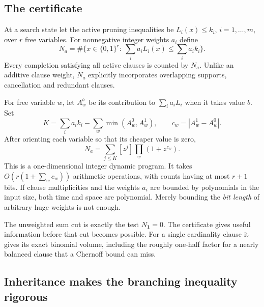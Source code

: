 \documentclass[11pt,a4paper]{article}
\theoremstyle{remark}
\begin{document}
\subsection{The certificate}

At a search state let the active pruning inequalities be
$L_i(x)\le k_i$, $i=1,\ldots,m$, over $r$ free variables. For nonnegative
integer weights $a_i$ define
\begin{equation}
 N_a=\#\{x\in\{0,1\}^r:\ \textstyle\sum_i a_i L_i(x)
                          \le\sum_i a_i k_i\}.             \label{eq:Na}
\end{equation}
Every completion satisfying all active clauses is counted by $N_a$.
Unlike an additive clause weight, $N_a$ explicitly incorporates overlapping
supports, cancellation and redundant clauses.

For free variable $w$, let $A_w^b$ be its contribution to
$\sum_i a_iL_i$ when it takes value $b$. Set
\[
 K=\sum_i a_i k_i-\sum_w\min(A_w^0,A_w^1),\qquad
 c_w=|A_w^1-A_w^0|.
\]
After orienting each variable so that its cheaper value is zero,
\begin{equation}
 N_a=\sum_{j\le K}[z^j]\prod_w(1+z^{c_w}).                  \label{eq:dp}
\end{equation}
This is a one-dimensional integer dynamic program. It takes
$O(r(1+\sum_w c_w))$ arithmetic operations, with counts having at most
$r+1$ bits. If clause multiplicities and the weights $a_i$ are bounded by
polynomials in the input size, both time and space are polynomial. Merely
bounding the \emph{bit length} of arbitrary huge weights is not enough.

The unweighted sum cut is exactly the test $N_{\boldsymbol 1}=0$.
The certificate gives useful information before that cut becomes possible.
For a single cardinality clause it gives its exact binomial volume, including
the roughly one-half factor for a nearly balanced clause that a Chernoff
bound can miss.

\subsection{Inheritance makes the branching inequality rigorous}
\end{document}
